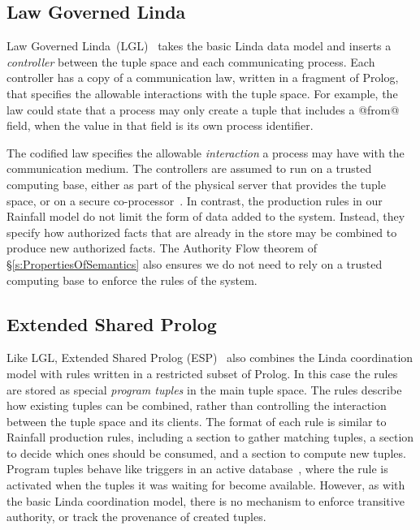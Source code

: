 \subsection{Law Governed Linda}
Law Governed Linda~(LGL)~\cite{Minsky1994:LawGovernedLinda, Minsky2001:SafeTupleSpace} takes the basic Linda data model and inserts a \emph{controller} between the tuple space and each communicating process. Each controller has a copy of a communication law, written in a fragment of Prolog, that specifies the allowable interactions with the tuple space. For example, the law could  state that a process may only create a tuple that includes a @from@ field, when the value in that field is its own process identifier.

The codified law specifies the allowable \emph{interaction} a process may have with the communication medium. The controllers are assumed to run on a trusted computing base, either as part of the physical server that provides the tuple space, or on a secure co-processor~\cite{Minsky2001:SafeTupleSpace}. In contrast, the production rules in our Rainfall model do not limit the form of data added to the system. Instead, they specify how authorized facts that are already in the store may be combined to produce new authorized facts. The Authority Flow theorem of \S\ref{s:PropertiesOfSemantics} also ensures we do not need to rely on a trusted computing base to enforce the rules of the system.


\subsection{Extended Shared Prolog}
Like LGL, Extended Shared Prolog (ESP)~\cite{Ciancarini1993:Coordinating, Ciancarini1994:LogicTupleSpaces} also combines the Linda coordination model with rules written in a restricted subset of Prolog. In this case the rules are stored as special \emph{program tuples} in the main tuple space. The rules describe how existing tuples can be combined, rather than controlling the interaction between the tuple space and its clients. The format of each rule is similar to Rainfall production rules, including a section to gather matching tuples, a section to decide which ones should be consumed, and a section to compute new tuples. Program tuples behave like triggers in an active database~\cite{Paton1999:Active}, where the rule is activated when the tuples it was waiting for become available. However, as with the basic Linda coordination model, there is no mechanism to enforce transitive authority, or track the provenance of created tuples.

